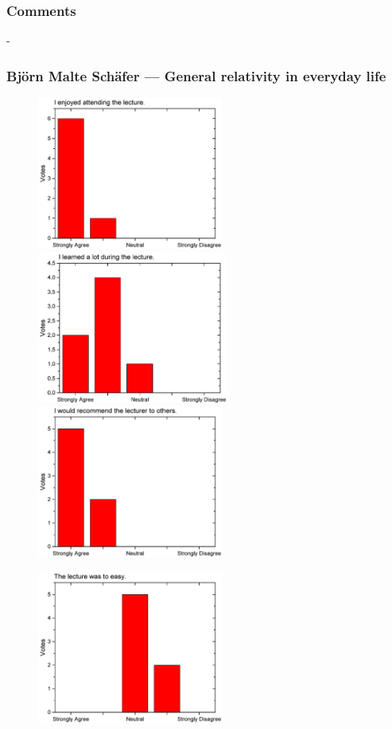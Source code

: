 \subsubsection*{Comments}
-
\newpage

\subsubsection{Bj\"orn Malte Schäfer  --- General relativity in everyday life}
\begin{figure}[h!]
  \centering
  \begin{minipage}{.48\linewidth}
    \centering
      {\includegraphics[height=50mm]{figures/n/Graph61.pdf}}
      {\includegraphics[height=50mm]{figures/n/Graph62.pdf}}
      {\includegraphics[height=50mm]{figures/n/Graph63.pdf}}
  \end{minipage}\quad
  \begin{minipage}{.48\linewidth}
    \centering
      {\includegraphics[height=50mm]{figures/n/Graph64.pdf}}

\end{minipage}
\end{figure}
